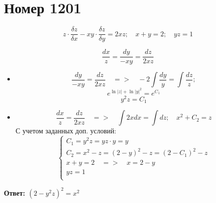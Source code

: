 \section*{Номер 1201}

$$ z \cdot \dfrac{\delta z}{\delta x} - xy \cdot \dfrac{\delta z}{\delta y} = 2xz; \quad x + y = 2; \quad yz = 1 $$

\begin{solution}
    $$ \dfrac{dx}{z} = \dfrac{dy}{-xy} = \dfrac{dz}{2xz} $$

    \begin{itemize}
        \item
              $$ \dfrac{dy}{-xy} = \dfrac{dz}{2xz}\quad=>\quad -2\int \dfrac{dy}{y} = \int \dfrac{dz}{z}; $$
              $$ e^{\ln |z| + \ln |y|^2} = e^{C_1} $$
              $$ y^2 z = C_1 $$
        \item
              $$ \dfrac{dx}{z} = \dfrac{dz}{2xz} \quad=>\quad \int 2xdx = \int dz; \quad x^2 + C_2 = z $$
              С учетом заданных доп. условий:
              $$
                  \begin{cases}
                      C_1 = y^2 z = yz \cdot y = y                    \\
                      C_2 = x^2 - z = (2 - y)^2 - z = (2 - C_1)^2 - z \\
                      x + y = 2 \quad=>\quad x = 2 - y                \\
                      yz = 1                                          \\
                  \end{cases}
              $$
    \end{itemize}
    \textbf{Ответ: $ (2 - y^2 z)^2 = x^2 $}
\end{solution}\pagebreak